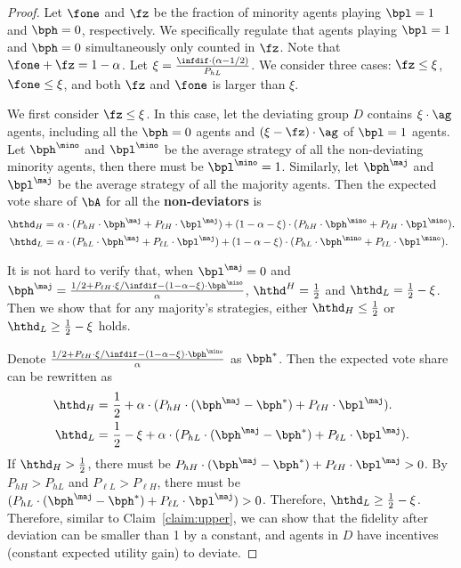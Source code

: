 \begin{proof}
    Let $\fone$ and $\fz$ be the fraction of minority agents playing $\bpl = 1$ and $\bph = 0$, respectively. We specifically regulate that agents playing $\bpl = 1$ and $\bph = 0$ simultaneously only counted in $\fz$. Note that $\fone + \fz = 1 - \alpha$. Let $\xi = \frac{\infdif \cdot (\alpha - 1/2)}{P_{hL}}$. We consider three cases: $\fz \le \xi$, $\fone \le \xi$, and both $\fz$ and $\fone$ is larger than $\xi$. 

    We first consider $\fz \le \xi$. In this case, let the deviating group $D$ contains $\xi\cdot \ag$ agents, including all the $\bph = 0$ agents and $(\xi - \fz)\cdot \ag$ of $\bpl = 1$ agents. Let $\bph^{\mino}$ and $\bpl^{\mino}$ be the average strategy of all the non-deviating minority agents, then there must be $\bpl^{\mino} = 1$. Similarly, let $\bph^{\maj}$ and $\bpl^{\maj}$ be the average strategy of all the majority agents. Then the expected vote share of $\bA$ for all the \textbf{non-deviators} is 
    \begin{align*}
        \hthd_H =&\ \alpha\cdot (P_{hH}\cdot \bph^{\maj} + P_{\ell H}\cdot \bpl^{\maj}) +  (1 - \alpha - \xi)\cdot (P_{hH}\cdot \bph^{\mino} + P_{\ell H}\cdot \bpl^{\mino}).\\
        \hthd_L =&\ \alpha\cdot (P_{hL}\cdot \bph^{\maj} + P_{\ell L}\cdot \bpl^{\maj}) +  (1 - \alpha - \xi)\cdot (P_{hL}\cdot \bph^{\mino} + P_{\ell L}\cdot \bpl^{\mino}).
    \end{align*}

    It is not hard to verify that, when $\bpl^{\maj} = 0$ and $\bph^{\maj} = \frac{1/2 + P_{\ell H} \cdot \xi / \infdif - (1 -\alpha-\xi) \cdot \bph^{\mino}}{\alpha}$, $\hthd^H = \frac12$ and $\hthd_L = \frac12 - \xi$. Then we show that for any majority's strategies, either $\hthd_H \le \frac12$ or $\hthd_L \ge \frac12 - \xi$ holds.

    Denote $\frac{1/2 + P_{\ell H} \cdot \xi / \infdif - (1 -\alpha-\xi) \cdot \bph^{\mino}}{\alpha}$ as $\bph^*$. Then the expected vote share can be rewritten as 
    \begin{align*}
        \hthd_H =&\ \frac12 + \alpha\cdot (P_{hH}\cdot (\bph^{\maj} - \bph^*) + P_{\ell H}\cdot \bpl^{\maj}).\\
        \hthd_L =&\ \frac12 - \xi + \alpha\cdot (P_{hL}\cdot (\bph^{\maj} - \bph^*) + P_{\ell L}\cdot \bpl^{\maj}).
    \end{align*}
    If $\hthd_H > \frac12$, there must be $P_{hH}\cdot (\bph^{\maj} - \bph^*) + P_{\ell H}\cdot \bpl^{\maj} > 0$. By $P_{hH} > P_{hL}$ and $P_{\ell L} > P_{\ell H}$, there must be $ (P_{hL}\cdot (\bph^{\maj} - \bph^*) + P_{\ell L}\cdot \bpl^{\maj}) > 0$. Therefore, $\hthd_L \ge \frac12 - \xi$. Therefore, similar to Claim~\ref{claim:upper}, we can show that the fidelity after deviation can be smaller than 1 by a constant, and agents in $D$ have incentives (constant expected utility gain) to deviate.  


\end{proof}
